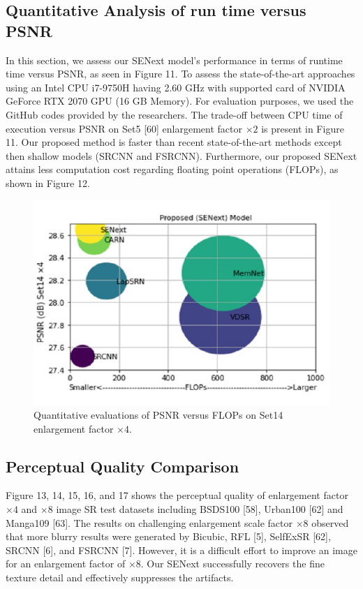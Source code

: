 \documentclass{ieeeaccess}
\begin{document}
\subsection{Quantitative Analysis of run time versus PSNR}
In this section, we assess our SENext model's performance in terms of runtime time versus PSNR, as seen in Figure 11. To assess the state-of-the-art approaches using an Intel CPU i7-9750H having 2.60 GHz with supported card of NVIDIA GeForce RTX 2070 GPU (16 GB Memory). For evaluation purposes, we used the GitHub codes provided by the researchers. The trade-off between CPU time of execution versus PSNR on Set5 [60] enlargement factor $\times 2$ is present in Figure 11. Our proposed method is faster than recent state-of-the-art methods except then shallow models (SRCNN and FSRCNN). Furthermore, our proposed SENext attains less computation cost regarding floating point operations (FLOPs), as shown in Figure 12.

\begin{figure}[ht]
  \includegraphics[width=\linewidth]{12FIGURE.pdf}
  \caption{Quantitative evaluations of PSNR versus FLOPs on Set14 enlargement factor $\times4$.}
  \label{fig:12}
\end{figure}





\subsection{Perceptual Quality Comparison}
Figure 13, 14, 15, 16, and 17 shows the perceptual quality of enlargement factor $\times 4$ and $\times 8$ image SR test datasets including BSDS100 [58], Urban100 [62] and Manga109 [63]. The results on challenging enlargement scale factor $\times 8$ observed that more blurry results were generated by Bicubic, RFL [5], SelfExSR [62], SRCNN [6], and FSRCNN [7]. However, it is a difficult effort to improve an image for an enlargement factor of $\times 8$. Our SENext successfully recovers the fine texture detail and effectively suppresses the artifacts.
\end{document}

